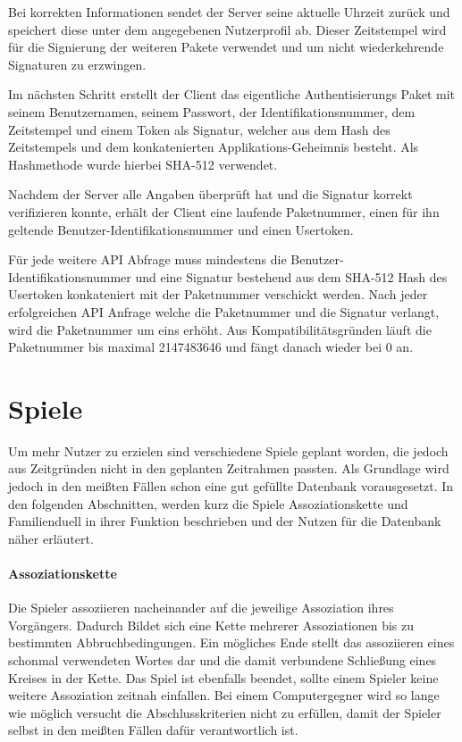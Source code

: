 Bei korrekten Informationen sendet der Server seine aktuelle Uhrzeit zurück
und speichert diese unter dem angegebenen Nutzerprofil ab. Dieser Zeitstempel
wird für die Signierung der weiteren Pakete verwendet und um nicht wiederkehrende
Signaturen zu erzwingen.

Im nächsten Schritt erstellt der Client das eigentliche Authentisierungs Paket mit
seinem Benutzernamen, seinem Passwort, der Identifikationsnummer, dem Zeitstempel
und einem Token als Signatur, welcher aus dem Hash des Zeitstempels und dem
konkatenierten Applikations-Geheimnis besteht. Als Hashmethode wurde hierbei
SHA-512 verwendet.

Nachdem der Server alle Angaben überprüft hat und die Signatur korrekt
verifizieren konnte, erhält der Client eine laufende Paketnummer, einen für ihn
geltende Benutzer-Identifikationsnummer und einen Usertoken.

Für jede weitere API Abfrage muss mindestens die Benutzer-Identifikationsnummer
und eine Signatur bestehend aus dem SHA-512 Hash des Usertoken konkateniert mit
der Paketnummer verschickt werden. Nach jeder erfolgreichen API Anfrage welche
die Paketnummer und die Signatur verlangt, wird die Paketnummer um eins erhöht.
Aus Kompatibilitätsgründen läuft die Paketnummer bis maximal 2147483646 und
fängt danach wieder bei 0 an.


\section{Spiele}\label{sec:spiele}
Um mehr Nutzer zu erzielen sind verschiedene Spiele geplant worden, die jedoch
aus Zeitgründen nicht in den geplanten Zeitrahmen passten.
Als Grundlage wird jedoch in den meißten Fällen schon eine gut gefüllte Datenbank
vorausgesetzt. In den folgenden Abschnitten, werden kurz die Spiele
Assoziationskette und Familienduell in ihrer Funktion beschrieben und der Nutzen
für die Datenbank näher erläutert.

\paragraph{Assoziationskette}
Die Spieler assoziieren nacheinander auf die jeweilige Assoziation ihres
Vorgängers. Dadurch Bildet sich eine Kette mehrerer Assoziationen bis
zu bestimmten Abbruchbedingungen. Ein mögliches Ende stellt das assoziieren
eines schonmal verwendeten Wortes dar und die damit verbundene Schließung eines
Kreises in der Kette. Das Spiel ist ebenfalls beendet, sollte einem Spieler
keine weitere Assoziation zeitnah einfallen. Bei einem Computergegner wird
so lange wie möglich versucht die Abschlusskriterien nicht zu erfüllen, damit
der Spieler selbst in den meißten Fällen dafür verantwortlich ist.

